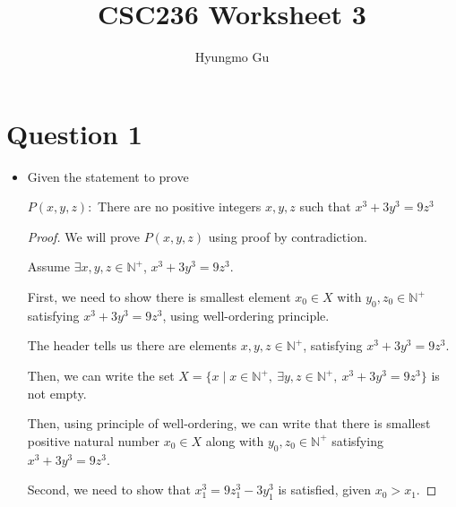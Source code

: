 \documentclass[12pt]{article}
\begin{document}
\title{CSC236 Worksheet 3}
\author{Hyungmo Gu}
\maketitle

\section*{Question 1}

\bigskip

\begin{itemize}
    \item
    Given the statement to prove

    \bigskip

    \begin{center}
        $P(x,y,z):$ There are no positive integers $x,y,z$ such that $x^3 + 3y^3 = 9z^3$
    \end{center}

    \bigskip

    \begin{proof}

        We will prove $P(x,y,z)$ using proof by contradiction.

        \bigskip

        Assume $\exists x,y,z \in \mathbb{N}^{+}$, $x^3 + 3y^3 = 9z^3$.

        \bigskip

        First, we need to show there is smallest element $x_0 \in X$ with $y_0,z_0 \in \mathbb{N}^+$
        satisfying $x^3 + 3y^3 = 9z^3$, using well-ordering principle.

        \bigskip

        The header tells us there are elements $x,y,z \in \mathbb{N}^+$, satisfying
        $x^3 + 3y^3 = 9z^3$.

        \bigskip

        Then, we can write the set $X = \{x \mid x \in \mathbb{N}^+,\:\exists y,z \in
        \mathbb{N}^+,\:x^3 + 3y^3 = 9z^3\}$ is not empty.

        \bigskip

        Then, using principle of well-ordering, we can write that there is smallest
        positive natural number $x_0 \in X$ along with $y_0,z_0 \in \mathbb{N}^+$ satisfying
        $x^3 + 3y^3 = 9z^3$.

        \bigskip

        Second, we need to show that $x_1^3 = 9z_1^3 - 3y_1^3$ is satisfied, given
        $x_0 > x_1$.


\end{proof}
\end{itemize}
\end{document}
